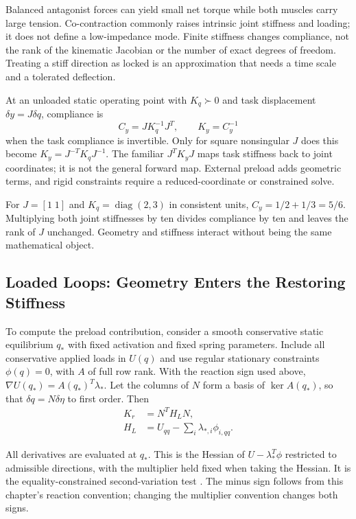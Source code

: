 Balanced antagonist forces can yield small net torque while both muscles carry
large tension. Co-contraction commonly raises intrinsic joint stiffness and
loading; it does not define a low-impedance mode. Finite stiffness changes
compliance, not the rank of the kinematic Jacobian or the number of exact
degrees of freedom. Treating a stiff direction as locked is an approximation
that needs a time scale and a tolerated deflection.

At an unloaded static operating point with $K_q\succ0$ and task displacement
$\delta y=J\delta q$, compliance is
\begin{equation}
C_y=J K_q^{-1}J^T,\qquad K_y=C_y^{-1}
\label{eq:effective_impedance}
\end{equation}
when the task compliance is invertible. Only for square nonsingular $J$ does
this become $K_y=J^{-T}K_qJ^{-1}$. The familiar $J^TK_yJ$ maps task stiffness
back to joint coordinates; it is not the general forward map. External
preload adds geometric terms, and rigid constraints require a reduced-coordinate
or constrained solve.

For $J=[1\;1]$ and $K_q=\operatorname{diag}(2,3)$ in consistent units,
$C_y=1/2+1/3=5/6$. Multiplying both joint stiffnesses by ten divides compliance
by ten and leaves the rank of $J$ unchanged. Geometry and stiffness interact
without being the same mathematical object.

\subsection{Loaded Loops: Geometry Enters the Restoring Stiffness}

To compute the preload contribution, consider a smooth conservative static
equilibrium $q_*$ with fixed activation and fixed spring parameters. Include
all conservative applied loads in $U(q)$ and use regular stationary constraints
$\phi(q)=0$, with $A$ of full row rank. With the reaction sign used above,
$\nabla U(q_*)=A(q_*)^T\lambda_*$. Let the columns of $N$ form a basis of
$\ker A(q_*)$, so that $\delta q=N\delta\eta$ to first order. Then
\begin{equation}
\begin{aligned}
K_r&=N^TH_LN,\\
H_L&=U_{qq}-\sum_i\lambda_{*,i}\phi_{i,qq}.
\end{aligned}
\label{eq:loaded-loop-stiffness}
\end{equation}

All derivatives are evaluated at $q_*$. This is the Hessian of
$U-\lambda_*^T\phi$ restricted to admissible directions, with the multiplier
held fixed when taking the Hessian. It is the equality-constrained
second-variation test \cite{Freund2004ConstrainedOptimality}. The minus sign follows from this chapter's
reaction convention; changing the multiplier convention changes both signs.

